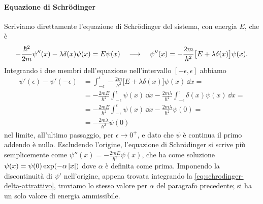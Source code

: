 \paragraph{Equazione di Schr\"odinger}
Scriviamo direttamente l'equazione di Schr\"odinger del sistema, con energia $E$, che è
\begin{equation}
	-\frac{\hbar^2}{2m}\psi''(x)-\lambda\delta(x)\psi(x)=E\psi(x)\quad\longrightarrow\quad \psi''(x)=-\frac{2m}{\hbar^2}\big[E+\lambda\delta(x)\big]\psi(x).
	\label{eq:schrodinger-delta-attrattivo}
\end{equation}
Integrando i due membri dell'equazione nell'intervallo $[-\epsilon,\epsilon]$ abbiamo
\begin{equation}
	\begin{split}
		\psi'(\epsilon)-\psi'(-\epsilon)&=\int_{-\epsilon}^{\epsilon}-\frac{2m}{\hbar^2}\big[E+\lambda\delta(x)\big]\psi(x)\,\dd x=\\
		&=-\frac{2mE}{\hbar^2}\int_{-\epsilon}^{\epsilon}\psi(x)\,\dd x-\frac{2m\lambda}{\hbar^2}\int_{-\epsilon}^{\epsilon}\delta(x)\psi(x)\,\dd x=\\
		&=-\frac{2mE}{\hbar^2}\int_{-\epsilon}^{\epsilon}\psi(x)\,\dd x-\frac{2m\lambda}{\hbar^2}\psi(0)=\\
		&=-\frac{2m\lambda}{\hbar^2}\psi(0)
	\end{split}
\end{equation}
nel limite, all'ultimo passaggio, per $\epsilon\to 0^+$, e dato che $\psi$ è continua il primo addendo è nullo.
Escludendo l'origine, l'equazione di Schr\"odinger si scrive più semplicemente come $\psi''(x)=-\frac{2mE}{\hbar^2}\psi(x)$, che ha come soluzione $\psi(x)=\psi(0)\exp(-\alpha\left|{x}\right|)$ dove $\alpha$ è definita come prima.
Imponendo la discontinuità di $\psi'$ nell'origine, appena trovata integrando la \eqref{eq:schrodinger-delta-attrattivo}, troviamo lo stesso valore per $\alpha$ del paragrafo precedente; si ha un solo valore di energia ammissibile.

